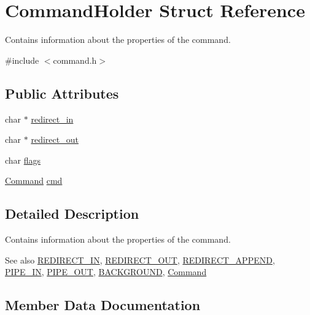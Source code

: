 \hypertarget{structCommandHolder}{}\section{Command\+Holder Struct Reference}
\label{structCommandHolder}


Contains information about the properties of the command.  




{\ttfamily \#include $<$command.\+h$>$}

\subsection*{Public Attributes}
\begin{DoxyCompactItemize}
\item 
char $\ast$ \hyperlink{structCommandHolder_a3691bd22096644e8c6be327fc7d0d246}{redirect\+\_\+in}
\item 
char $\ast$ \hyperlink{structCommandHolder_ac7bfc3e78a8e8b511e2b324c45a17d6f}{redirect\+\_\+out}
\item 
char \hyperlink{structCommandHolder_acb381d6ab29bc574dc1ff452adc7847a}{flags}
\item 
\hyperlink{unionCommand}{Command} \hyperlink{structCommandHolder_a83a7e82024a6f736ffebed0792aa12a9}{cmd}
\end{DoxyCompactItemize}


\subsection{Detailed Description}
Contains information about the properties of the command. 

\begin{DoxySeeAlso}{See also}
\hyperlink{command_8h_ab6714acca9cb634f10b7f5a23c349e3e}{R\+E\+D\+I\+R\+E\+C\+T\+\_\+\+IN}, \hyperlink{command_8h_af178f598332c2233dfbdc334a05a2a66}{R\+E\+D\+I\+R\+E\+C\+T\+\_\+\+O\+UT}, \hyperlink{command_8h_a6b682fe2ba1a0c489d50822c3feecdac}{R\+E\+D\+I\+R\+E\+C\+T\+\_\+\+A\+P\+P\+E\+ND}, \hyperlink{command_8h_a3fc15bc38c2cd3ce6f7dd40f4c0115dd}{P\+I\+P\+E\+\_\+\+IN}, \hyperlink{command_8h_af2aa1b20c10d6507c47f11588e21c324}{P\+I\+P\+E\+\_\+\+O\+UT}, \hyperlink{command_8h_a850b2f07a67b73890889e63fb8a49fda}{B\+A\+C\+K\+G\+R\+O\+U\+ND}, \hyperlink{unionCommand}{Command} 
\end{DoxySeeAlso}


\subsection{Member Data Documentation}
\mbox{\label{structCommandHolder_a83a7e82024a6f736ffebed0792aa12a9}} 
